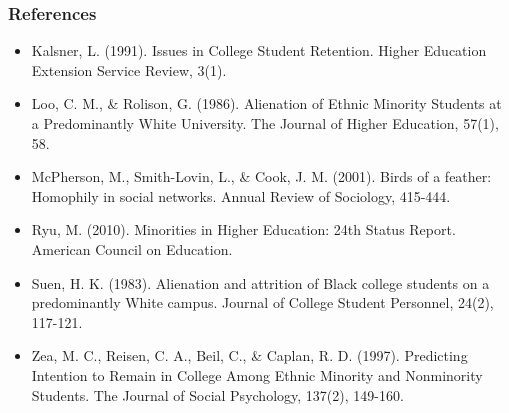\documentclass{beamer}
\begin{document}

\begin{frame}
\frametitle{References}

\scriptsize
\begin{itemize}
\itemsep.5em

\item Kalsner, L. (1991). Issues in College Student Retention. Higher Education
Extension Service Review, 3(1). 

\item Loo, C. M., \& Rolison, G. (1986). Alienation of Ethnic Minority Students at a
Predominantly White University. The Journal of Higher Education, 57(1), 58.

\item McPherson, M., Smith-Lovin, L., \& Cook, J. M. (2001). Birds of a feather:
Homophily in social networks. Annual Review of Sociology, 415-444.

\item Ryu, M. (2010). Minorities in Higher Education: 24th Status Report. American Council on Education.

\item Suen, H. K. (1983). Alienation and attrition of Black college students on a predominantly White campus. Journal of College Student Personnel, 24(2),
117-121.

\item Zea, M. C., Reisen, C. A., Beil, C., \& Caplan, R. D. (1997). Predicting
Intention to Remain in College Among Ethnic Minority and Nonminority Students.
The Journal of Social Psychology, 137(2), 149-160.
\end{itemize}
\end{frame}

\end{document}
